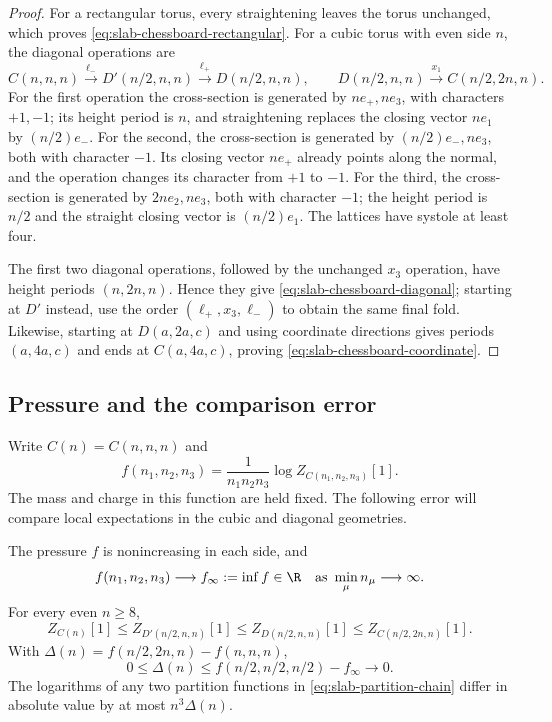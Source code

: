 \begin{proof}
For a rectangular torus, every straightening leaves the torus unchanged,
which proves \eqref{eq:slab-chessboard-rectangular}. For a cubic torus
with even side $n$, the diagonal operations are
\begin{equation}\label{eq:slab-three-untwistings}
 C(n,n,n)\xrightarrow{\ell_-}D'(n/2,n,n)
          \xrightarrow{\ell_+}D(n/2,n,n),
 \qquad D(n/2,n,n)\xrightarrow{x_1}C(n/2,2n,n).
\end{equation}
For the first operation the cross-section is generated by $ne_+,ne_3$,
with characters $+1,-1$; its height period is $n$, and straightening
replaces the closing vector $ne_1$ by $(n/2)e_-$. For the second, the
cross-section is generated by $(n/2)e_-,ne_3$, both with character
$-1$. Its closing vector $ne_+$ already points along the normal,
and the operation changes its character from $+1$ to $-1$. For the
third, the cross-section is generated by $2ne_2,ne_3$, both with
character $-1$; the height period is $n/2$ and the straight closing
vector is $(n/2)e_1$. The lattices have systole at least four.

The first two diagonal operations, followed by the unchanged $x_3$
operation, have height periods $(n,2n,n)$. Hence they give
\eqref{eq:slab-chessboard-diagonal}; starting at $D'$ instead, use
the order $(\ell_+,x_3,\ell_-)$ to obtain the same final fold.
Likewise, starting at $D(a,2a,c)$ and using coordinate directions
gives periods $(a,4a,c)$ and ends at $C(a,4a,c)$, proving
\eqref{eq:slab-chessboard-coordinate}.
\end{proof}

\subsection{Pressure and the comparison error}\label{subsec:slab-pressure}

Write $C(n)=C(n,n,n)$ and
\[
 f(n_1,n_2,n_3)=\frac1{n_1n_2n_3}\log Z_{C(n_1,n_2,n_3)}[1].
\]
The mass and charge in this function are held fixed. The following
error will compare local expectations in the cubic and diagonal
geometries.

\begin{proposition}\label{prop:slab-pressure}
The pressure $f$ is nonincreasing in each side, and
\[
 f(n_1,n_2,n_3)\longrightarrow f_\infty:=\inf f\in\R
                     \quad\text{as }\min_\mu n_\mu\longrightarrow\infty.
\]
For every even $n\ge8$,
\begin{equation}\label{eq:slab-partition-chain}
 Z_{C(n)}[1]\le Z_{D'(n/2,n,n)}[1]
       \le Z_{D(n/2,n,n)}[1]\le Z_{C(n/2,2n,n)}[1].
\end{equation}
With $\Delta(n)=f(n/2,2n,n)-f(n,n,n)$,
\begin{equation}\label{eq:slab-pressure-error}
 0\le\Delta(n)\le f(n/2,n/2,n/2)-f_\infty\longrightarrow0.
\end{equation}
The logarithms of any two partition functions in
\eqref{eq:slab-partition-chain} differ in absolute value by at most
$n^3\Delta(n)$.
\end{proposition}


